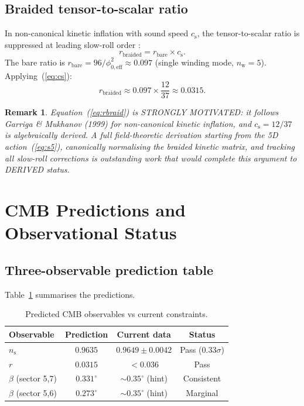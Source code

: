 \documentclass[12pt,a4paper]{article}
\newtheorem{remark}[theorem]{Remark}
\newcommand{\nw}{n_{\mathrm{w}}}
\newcommand{\cs}{c_{\mathrm{s}}}
\newcommand{\ns}{n_{\mathrm{s}}}
\begin{document}
\subsection{Braided tensor-to-scalar ratio}

In non-canonical kinetic inflation with sound speed $\cs$, the tensor-to-scalar
ratio is suppressed at leading slow-roll order \cite{GarrigaMukhanov1999}:
\begin{equation}
  r_{\mathrm{braided}} = r_{\mathrm{bare}}\times\cs .
  \label{eq:rbraid}
\end{equation}
The bare ratio is $r_{\mathrm{bare}}=96/\phi_{0,\mathrm{eff}}^2\approx 0.097$
(single winding mode, $\nw=5$).  Applying~(\ref{eq:cs}):
\begin{equation}
  r_{\mathrm{braided}} \approx 0.097\times\frac{12}{37} \approx 0.0315 .
  \label{eq:rval}
\end{equation}
\begin{remark}
  Equation~(\ref{eq:rbraid}) is STRONGLY MOTIVATED: it follows Garriga \&
  Mukhanov (1999) for non-canonical kinetic inflation, and $\cs=12/37$ is
  algebraically derived.  A full field-theoretic derivation starting from the
  5D action~(\ref{eq:s5}), canonically normalising the braided kinetic matrix,
  and tracking all slow-roll corrections is outstanding work that would complete
  this argument to DERIVED status.
\end{remark}

\section{CMB Predictions and Observational Status}
\label{sec:cmb}

\subsection{Three-observable prediction table}

Table~\ref{tab:obs} summarises the predictions.

\begin{table}[h]
\centering
\caption{Predicted CMB observables vs current constraints.}
\label{tab:obs}
\begin{tabular}{lccc}
\toprule
Observable & Prediction & Current data & Status \\
\midrule
$\ns$ & $0.9635$ & $0.9649\pm0.0042$ \cite{Planck2018} & Pass ($0.33\sigma$) \\
$r$ & $0.0315$ & $<0.036$ \cite{BICEPKeck2022} & Pass \\
$\beta$ (sector 5,7) & $0.331^\circ$ & $\sim0.35^\circ$ (hint) \cite{MinamiKomatsu2020,DiegoPalazuelos2022} & Consistent \\
$\beta$ (sector 5,6) & $0.273^\circ$ & $\sim0.35^\circ$ (hint) & Marginal \\
\bottomrule
\end{tabular}
\end{table}
\end{document}
